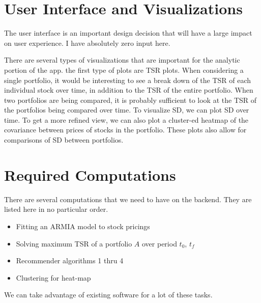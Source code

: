 \documentclass{article}
\begin{document}
\section{User Interface and Visualizations}
The user interface is an important design decision that will have a large impact on user experience. I have absolutely zero input here.

There are several types of visualizations that are important for the analytic portion of the app. the first type of plots are TSR plots. When considering a single portfolio, it would be interesting to see a break down of the TSR of each individual stock over time, in addition to the TSR of the entire portfolio. When two portfolios are being compared, it is probably sufficient to look at the TSR of the portfolios being compared over time. To visualize SD, we can plot SD over time. To get a more refined view, we can also plot a cluster-ed heatmap of the covariance between prices of stocks in the portfolio. These plots also allow for comparisons of SD between portfolios.

\section{Required Computations}

There are several computations that we need to have on the backend. They are listed here in no particular order.
\begin{itemize}
    \item Fitting an ARMIA model to stock pricings
    \item Solving maximum TSR of a portfolio $A$ over period $t_0$, $t_f$
    \item Recommender algorithms 1 thru 4
    \item Clustering for heat-map
\end{itemize}

We can take advantage of existing software for a lot of these tasks.
\end{document}
